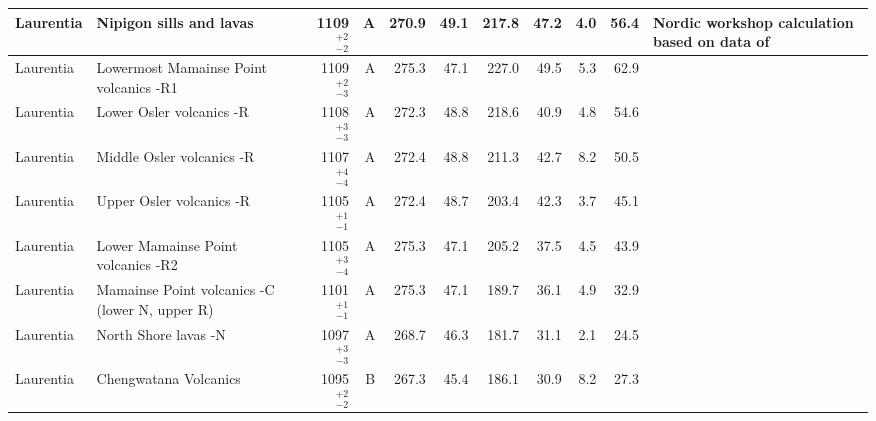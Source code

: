 \documentclass[twocolumn, switch]{article} %
\begin{document}
{\begin{landscape}
\begin{ThreePartTable}
\begin{longtable}{p{1.4 in}p{1.2 in}rrrrrrrrp{1.2 in}}
                     Laurentia &                            Nipigon sills and lavas &     1109$^{+2}_{-2}$ &      A &     270.9 &      49.1 & 217.8 &  47.2 &       4.0 &        56.4 &  Nordic workshop calculation based on data of \cite{Palmer1970a, Robertson1971a, Pesonen1979a, Pesonen1979b, Middleton2004a, Borradaile2006a} \\ \hline
                     Laurentia &             Lowermost Mamainse Point volcanics -R1 &     1109$^{+2}_{-3}$ &      A &     275.3 &      47.1 & 227.0 &  49.5 &       5.3 &        62.9 &                         \cite{Swanson-Hysell2014a} \\ \hline
                     Laurentia &                           Lower Osler volcanics -R &     1108$^{+3}_{-3}$ &      A &     272.3 &      48.8 & 218.6 &  40.9 &       4.8 &        54.6 &                         \cite{Swanson-Hysell2014b} \\ \hline
                     Laurentia &                          Middle Osler volcanics -R &     1107$^{+4}_{-4}$ &      A &     272.4 &      48.8 & 211.3 &  42.7 &       8.2 &        50.5 &                         \cite{Swanson-Hysell2014b} \\ \hline
                     Laurentia &                           Upper Osler volcanics -R &     1105$^{+1}_{-1}$ &      A &     272.4 &      48.7 & 203.4 &  42.3 &       3.7 &        45.1 &  \cite{Halls1974a, Swanson-Hysell2014b, Swanson-Hysell2019a} \\ \hline
                     Laurentia &                 Lower Mamainse Point volcanics -R2 &     1105$^{+3}_{-4}$ &      A &     275.3 &      47.1 & 205.2 &  37.5 &       4.5 &        43.9 &                         \cite{Swanson-Hysell2014a} \\ \hline
                     Laurentia &     Mamainse Point volcanics -C (lower N, upper R) &     1101$^{+1}_{-1}$ &      A &     275.3 &      47.1 & 189.7 &  36.1 &       4.9 &        32.9 &                         \cite{Swanson-Hysell2014a} \\ \hline
                     Laurentia &                               North Shore lavas -N &     1097$^{+3}_{-3}$ &      A &     268.7 &      46.3 & 181.7 &  31.1 &       2.1 &        24.5 &              \cite{Tauxe2009a,Swanson-Hysell2019a} \\ \hline
                     Laurentia &                              Chengwatana Volcanics &     1095$^{+2}_{-2}$ &      B &     267.3 &      45.4 & 186.1 &  30.9 &       8.2 &        27.3 &                                   \cite{Kean1997a} \\ \hline

\end{longtable}
\end{ThreePartTable}
\end{landscape}}
\end{document}
